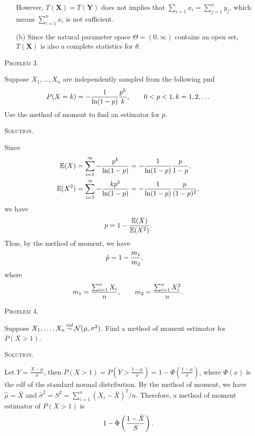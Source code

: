 \documentclass{article}
\begin{document}
\begin{CJK}{UTF8}{gbsn}
\begin{itemize}
              However, $T(\mathbf{X}) = T(\mathbf{Y})$ does not implies that $\sum_{i=1} x_i = \sum_{j=1}^n y_j$, which means $\sum_{i=1}^n x_i$ is not sufficient.
        \item [(b)] Since the natural parameter space $\Theta = (0, \infty)$ contains an open set,
              $T(\mathbf{X})$ is also a complete statistics for $\theta$.
    \end{itemize}




    \begin{shaded}
        \noindent\textsc{Problem 3.}\par
        Suppose $X_1,\ldots, X_n$ are independently sampled from the following pmf
        \begin{align}
            P(X=k)= - \frac{1}{\textnormal{ln}(1-p)} \frac{p^k}{k}, \qquad 0 < p < 1, k=1, 2,\ldots
        \end{align}
        Use the method of moment to find an estimator for $p$.
    \end{shaded}
    \noindent\textsc{Solution.}\par
    Since
    \begin{align}
        {\mathbb E}(X)   & = \sum_{i=1}^{\infty} -\frac{p^k}{\textnormal{ln}(1-p)} = -\frac{1}{\textnormal{ln}(1-p)} \frac{p}{1-p} , \notag    \\
        {\mathbb E}(X^2) & = \sum_{i=1}^{\infty} -\frac{kp^k}{\textnormal{ln}(1-p)} = -\frac{1}{\textnormal{ln}(1-p)} \frac{p}{(1-p)^2},\notag
    \end{align}
    we have
    \begin{align}
        p = 1 - \frac{{\mathbb E}(X)}{{\mathbb E}(X^2)}.\notag
    \end{align}
    Thus, by the method of moment, we have
    \begin{align}
        \hat{p} & = 1 - \frac{m_1}{m_2},\notag
    \end{align}
    where
    \begin{align}
        m_1 = \frac{\sum_{i=1}^n X_i}{n}, \qquad m_2 = \frac{\sum_{i=1}^n X_i^2}{n}.\notag
    \end{align}


    \begin{shaded}
        \noindent\textsc{Problem 4.}\par
        Suppose $X_1,\ldots, X_n \mathop{\sim}\limits^{iid} {\mathcal N}(\mu, \sigma^2)$. Find a method of moment
        estimator for $P(X>1)$.
    \end{shaded}
    \noindent\textsc{Solution.}\par
    Let $Y=\frac{X-\mu}{\sigma}$, then $P(X>1) = P(Y>\frac{1-\mu}{\sigma})= 1-\Phi\left (\frac{1-\mu}{\sigma}\right )$, where $\Phi(x)$ is the cdf of the standard normal distribution.
    By the method of moment, we have $\hat{\mu} = \bar{X}$ and $\hat{\sigma}^2 = S^2 = \sum_{i=1}^n (X_i - \bar{X})^2/n$.
    Therefore, a method of moment estimator of $P(X>1)$ is
    \begin{align}
        1 - \Phi\left (\frac{1-\bar{X}}{S}\right ).\notag
    \end{align}
\end{CJK}
\end{document}

